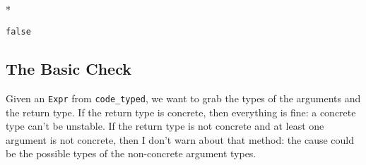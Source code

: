 \documentclass[letterpaper,10pt,english]{/usr/share/sphinx/texinputs/sphinxhowto}
\def\smaller{\fontsize{9.5pt}{9.5pt}\selectfont}
\newenvironment{InvisibleVerbatim}
        {\begin{mdframed}[leftmargin=0.1\linewidth,innerleftmargin=3pt,innerrightmargin=3pt, userdefinedwidth=1\linewidth, linewidth=0pt, linecolor=white, usetwoside=false]}
        {\end{mdframed}}
\begin{document}
                \makebox[0.1\linewidth]{\smaller\hfill\tt\color{nbframe-out-prompt}Out\hspace{4pt}{[}22{]}:\hspace{4pt}}\\*
                \vspace{-2.55\baselineskip}\begin{InvisibleVerbatim}
                \vspace{-0.5\baselineskip}
\begin{alltt}false\end{alltt}

            \end{InvisibleVerbatim}
            
        
    
\subsection{The Basic Check}Given an \texttt{Expr} from \texttt{code\_typed}, we want to grab the
types of the arguments and the return type. If the return type is
concrete, then everything is fine: a concrete type can't be unstable. If
the return type is not concrete and at least one argument is not
concrete, then I don't warn about that method: the cause could be the
possible types of the non-concrete argument types.

\end{document}
